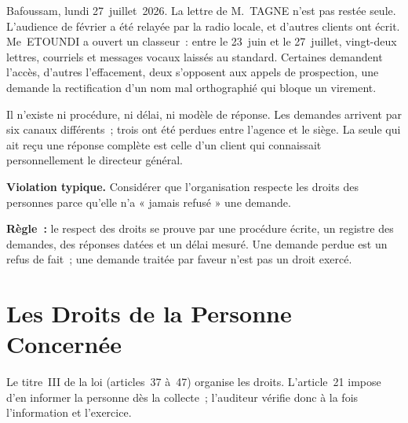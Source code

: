 Bafoussam, lundi 27~juillet~2026. La lettre de M.~TAGNE n'est pas restée
seule. L'audience de février a été relayée par la radio locale, et d'autres
clients ont écrit. Me~ETOUNDI a ouvert un classeur~: entre le 23~juin et le
27~juillet, vingt-deux lettres, courriels et messages vocaux laissés au
standard. Certaines demandent l'accès, d'autres l'effacement, deux
s'opposent aux appels de prospection, une demande la rectification d'un
nom mal orthographié qui bloque un virement.

Il n'existe ni procédure, ni délai, ni modèle de réponse. Les demandes
arrivent par six canaux différents~; trois ont été perdues entre l'agence
et le siège. La seule qui ait reçu une réponse complète est celle d'un
client qui connaissait personnellement le directeur général.

\begin{boxalert}
\textbf{Violation typique.} Considérer que l'organisation respecte les droits
des personnes parce qu'elle n'a « jamais refusé » une demande.

\smallskip
\textbf{Règle~:} le respect des droits se prouve par une procédure écrite,
un registre des demandes, des réponses datées et un délai mesuré. Une
demande perdue est un refus de fait~; une demande traitée par faveur
n'est pas un droit exercé.
\end{boxalert}

\section{Les Droits de la Personne Concernée}
\label{sec:c06-droits}

Le titre~III de la loi (articles~37 à~47) organise les droits. L'article~21
impose d'en informer la personne dès la collecte~; l'auditeur vérifie donc
à la fois l'information et l'exercice.

